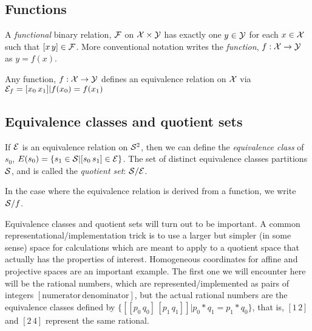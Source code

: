 \subsection{Functions}

A \textit{functional} binary relation, $\mathcal{F}$ on $\mathcal{X}
\times \mathcal{Y}$ has exactly one $y \in \mathcal{Y}$ for each
$x \in \mathcal{X}$ such that $[x \, y] \in \mathcal{F}$.
More conventional notation writes the \textit{function}, 
$f : \mathcal{X} \rightarrow \mathcal{Y}$ as $y = f(x)$.

Any function, $f : \mathcal{X} \rightarrow \mathcal{Y}$ defines an
equivalence relation on $\mathcal{X}$ via 
$\mathcal{E}_f = {[x_0 \, x_1] | f(x_0) = f(x_1)}$

\subsection{Equivalence classes and quotient sets}

If $\mathcal{E}$ is an equivalence relation on $\mathcal{S}^2$, then we
can define the \textit{equivalence class} of $s_0$, $E(s_0) = \{
s_1 \in \mathcal{S} | [s_0 \, s_1] \in \mathcal{E} \}$.
The set of distinct equivalence classes partitions $\mathcal{S}$,
and is called the \textit{quotient set}: $\mathcal{S} / \mathcal{E}$.

In the case where the equivalence relation is derived from a
function, we write $\mathcal{S} / f$.

Equivalence classes and quotient sets will turn out to be
important. A common representational/implementation trick is to
use a larger but simpler (in some sense) space for calculations
which are meant to apply to a quotient space that actually has the
properties of interest. Homogeneous coordinates for affine and
projective spaces  are an important example.
The first one we will encounter here will be the rational numbers,
which are represented/implemented as pairs of integers
$[\text{numerator} \, \text{denominator}]$, but the actual
rational numbers are the equivalence classes defined by 
$\{ [[p_0 \, q_0] \, [p_1 \, q_1]] | p_0*q_1 = p_1*q_0 \}$,
that is, $[1 \, 2]$ and $[2 \, 4]$ represent the same rational.



